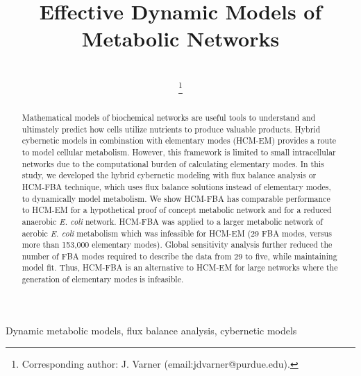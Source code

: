 \documentclass[10pt,twocolumn,twoside,final]{IEEEtran}
\begin{document}
\title{Effective Dynamic Models of Metabolic Networks}


\author{\\
\thanks{Corresponding author: J. Varner (email:jdvarner@purdue.edu).}}

\maketitle

\begin{abstract}
Mathematical models of biochemical networks are useful tools to understand and ultimately predict how cells utilize nutrients to produce valuable products.
Hybrid cybernetic models in combination with elementary modes (HCM-EM) provides a route to model cellular metabolism.
However, this framework is limited to small intracellular networks due to the computational burden of calculating elementary modes.
In this study, we developed the hybrid cybernetic modeling with flux balance analysis or HCM-FBA technique, which uses flux balance solutions instead of elementary modes,
to dynamically model metabolism.
We show HCM-FBA has comparable performance to HCM-EM for a hypothetical proof of concept metabolic network and for a reduced anaerobic \textit{E. coli} network.
HCM-FBA was applied to a larger metabolic network of aerobic \textit{E. coli} metabolism which was infeasible for HCM-EM (29 FBA modes, versus more than 153,000 elementary modes).
Global sensitivity analysis further reduced the number of FBA modes required to describe the data from 29 to five, while maintaining model fit.
Thus, HCM-FBA is an alternative to HCM-EM for large networks where the generation of elementary modes is infeasible.

\end{abstract}


\begin{IEEEkeywords}
Dynamic metabolic models, flux balance analysis, cybernetic models
\end{IEEEkeywords}
\end{document}
